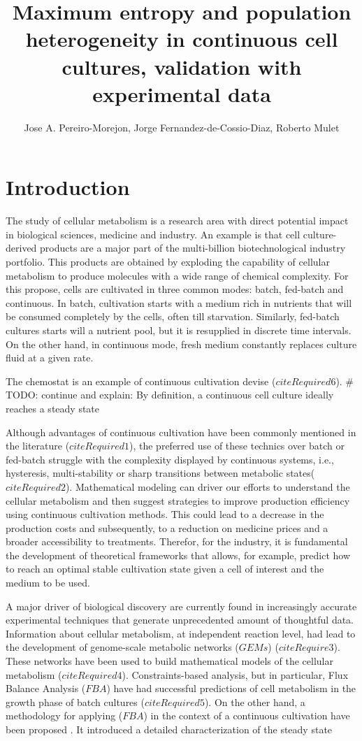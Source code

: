 \documentclass[]{article}
\title{Maximum entropy and population heterogeneity in 
	continuous cell cultures, validation with experimental data}
\author{Jose A. Pereiro-Morejon, Jorge Fernandez-de-Cossio-Diaz, Roberto Mulet }
\begin{document}
	
	\maketitle
	
	\section{Introduction}
	The study of cellular metabolism is a research area with direct potential impact in biological sciences, medicine and industry.
	An example is that cell culture-derived products are a major part of the multi-billion biotechnological industry portfolio. 
	This products are obtained by exploding the capability of cellular metabolism to produce molecules with a wide range of chemical complexity. 
	For this propose, cells are cultivated in three common modes: batch, fed-batch and continuous. 
	In batch, cultivation starts with a medium rich in nutrients that will be consumed completely by the cells, often till starvation. 
	Similarly, fed-batch cultures starts will a nutrient pool, but it is resupplied in discrete time intervals. 
	On the other hand, in continuous mode, fresh medium constantly replaces culture fluid at a given rate.
	
	The chemostat is an example of continuous cultivation devise ($citeRequired6$).
	# TODO: continue and explain: By definition, a continuous cell culture ideally reaches a steady state 
	
	Although advantages of continuous
cultivation have been commonly mentioned in the literature ($citeRequired1$), the preferred use of these technics over batch or fed-batch struggle with the complexity displayed by continuous systems, i.e., hysteresis, multi-stability or sharp transitions between metabolic states($citeRequired2$). 
	Mathematical modeling can driver our efforts to understand the cellular metabolism and then suggest strategies to improve production efficiency using continuous cultivation methods. 
	This could lead to a decrease in the production costs and subsequently, to a reduction on medicine prices and a broader accessibility to treatments.
	Therefor, for the industry, it is fundamental the development of theoretical frameworks that allows, for example, predict how to reach an optimal stable cultivation state given a cell of interest and the medium to be used. 
	
	A major driver of biological discovery are currently found in increasingly accurate experimental techniques that generate unprecedented amount of thoughtful data. Information about cellular metabolism, at independent reaction level, had lead to the development of genome-scale metabolic networks ($GEMs$) ($citeRequire3$). These networks have been used to build mathematical models of the cellular metabolism ($citeRequired4$). Constraints-based analysis, but in particular, Flux Balance Analysis ($FBA$) have had successful predictions of cell metabolism in the growth phase of batch cultures ($citeRequired5$). On the other hand, a methodology for applying ($FBA$) in the context of a continuous cultivation have been proposed . It introduced a detailed characterization of the steady state
	
\end{document}
